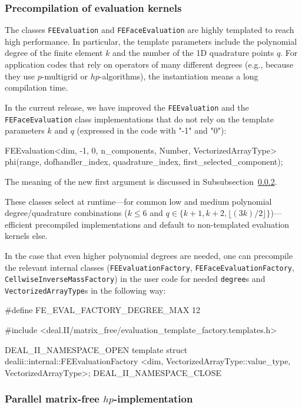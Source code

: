 \documentclass{ansarticle-preprint}
\begin{document}
\subsubsection{Precompilation of evaluation kernels}

The classes \texttt{FEEvaluation} and \texttt{FEFaceEvaluation} are highly
templated to reach high performance. In particular, the template parameters include
the polynomial degree of the finite element $k$ and the number of the 1D quadrature points $q$.
For application codes that rely on operators of many different degrees (e.g., because
they use $p$-multigrid or $hp$-algorithms), the instantiation
means a long compilation time.

In the current release, we have improved the \texttt{FEEvaluation} and the \texttt{FEFaceEvaluation} class implementations that do
not rely on the template parameters $k$ and $q$ (expressed in the code
with "-1" and "0"):
\begin{c++}
FEEvaluation<dim, -1, 0, n_components, Number, VectorizedArrayType>
  phi(range, dofhandler_index, quadrature_index, first_selected_component);
\end{c++}
The meaning of the new first argument is
discussed in Subsubsection~\ref{subsubsection:mf:hp}.

These classes select at runtime---for common low and medium polynomial degree/quadrature combinations ($k\le 6$ and $q\in\{ k+1, k+2, \lfloor (3k)/2 \rfloor \}$)---efficient precompiled implementations and default to non-templated
evaluation kernels else.

In the case that even higher polynomial degrees are needed, one can precompile the
relevant internal classes
(\texttt{FEEvaluationFactory}, \texttt{FEFaceEvaluationFactory}, \texttt{CellwiseInverseMassFactory}) in the user code for needed \texttt{degree}s
and \texttt{VectorizedArrayType}s in the following way:
\begin{c++}
#define FE_EVAL_FACTORY_DEGREE_MAX 12

#include <deal.II/matrix_free/evaluation_template_factory.templates.h>

DEAL_II_NAMESPACE_OPEN
template struct dealii::internal::FEEvaluationFactory
  <dim, VectorizedArrayType::value_type, VectorizedArrayType>;
DEAL_II_NAMESPACE_CLOSE
\end{c++}

\subsubsection{Parallel matrix-free $hp$-implementation}\label{subsubsection:mf:hp}
\end{document}

